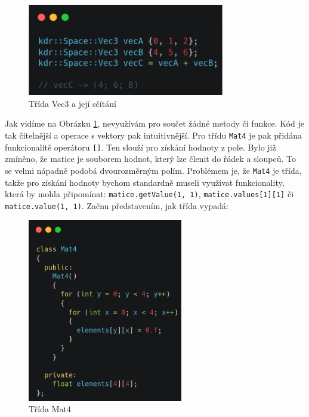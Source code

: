 \documentclass[12pt]{article}
\begin{document}
\vspace{0.5cm}
\begin{figure}[h]
    \centering
    \includegraphics[height=4cm]{images/overloading.png}
    \caption{Třída Vec3 a její sčítání}
    \label{fig:Třída Vec3 a její sčítání}
\end{figure}

Jak vidíme na Obrázku \ref{fig:Třída Vec3 a její sčítání}, nevyužívám pro součet žádné metody či funkce. Kód je tak čitelnější a operace s vektory pak intuitivnější. Pro třídu \texttt{Mat4} je pak přidána funkcionalitě operátoru \texttt{[]}. Ten slouží pro získání hodnoty z pole. Bylo již zmíněno, že matice je souborem hodnot, který lze členit do řádek a sloupců. To se velmi nápadně podobá dvourozměrným polím. Problémem je, že \texttt{Mat4} je třída, takže pro získání hodnoty bychom standardně museli využívat funkcionality, která by mohla připomínat: \texttt{matice.getValue(1, 1)}, \texttt{matice.values[1][1]} či \texttt{matice.value(1, 1)}. Začnu představením, jak třída vypadá:

\pagebreak

\begin{figure}[h]
    \centering
    \includegraphics[height=8cm]{images/mat.png}
    \caption{Třída Mat4}
    \label{fig:Třída Mat4}
\end{figure}
\end{document}
